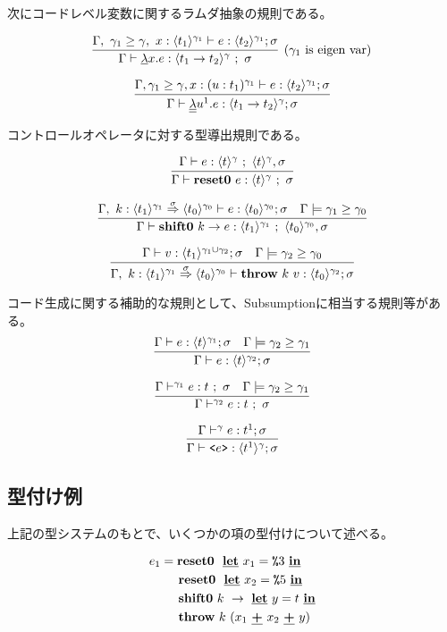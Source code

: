次にコードレベル変数に関するラムダ抽象の規則である。

\[
  \infer[(\gamma_1~\text{is eigen var})]
  {\Gamma \vdash \cfun{x}{e} : \codeT{t_1\to t_2}{\gamma} ~;~ \sigma}
  {\Gamma,~\gamma_1 \ord \gamma,~x:\codeT{t_1}{\gamma_1} \vdash e
    : \codeT{t_2}{\gamma_1}; \sigma}
\]

\[
  \infer
  {\Gamma \vdash \ccfun{u^1}{e} : \codeT{t_1 \to t_2}{\gamma} ; \sigma}
  {\Gamma, \gamma_1 \ord \gamma, x : (u : t_1)^{\gamma_1} \vdash e : \codeT{t_2}{\gamma_1} ; \sigma}
\]

コントロールオペレータに対する型導出規則である。

\[
  \infer{\Gamma \vdash \resetz{e} : \codeT{t}{\gamma} ~;~ \sigma}
  {\Gamma \vdash e : \codeT{t}{\gamma} ~;~ \codeT{t}{\gamma}, \sigma}
\]

\[
  \infer{\Gamma \vdash \shiftz{k}{e} : \codeT{t_1}{\gamma_1} ~;~ \codeT{t_0}{\gamma_0},\sigma}
  {\Gamma,~k:\contT{\codeT{t_1}{\gamma_1}}{\codeT{t_0}{\gamma_0}}{\sigma}
    \vdash e : \codeT{t_0}{\gamma_0} ; \sigma
    & \Gamma \models \gamma_1 \ord \gamma_0
  }
\]

\[
  \infer
  {\Gamma,~k:\contT{\codeT{t_1}{\gamma_1}}{\codeT{t_0}{\gamma_0}}{\sigma}
    \vdash \throw{k}{v} : \codeT{t_0}{\gamma_2} ; \sigma}
  {\Gamma
    \vdash v : \codeT{t_1}{\gamma_1 \cup \gamma_2} ; \sigma
    & \Gamma \models \gamma_2 \ord \gamma_0
  }
\]

コード生成に関する補助的な規則として、Subsumptionに相当する規則等がある。
\[
  \infer
  {\Gamma \vdash e : \codeT{t}{\gamma_2} ; \sigma}
  {\Gamma \vdash e : \codeT{t}{\gamma_1} ; \sigma
    & \Gamma \models \gamma_2 \ord \gamma_1
  }
\]

\[
  \infer
  {\Gamma \vdash^{\gamma_2} e : t ~;~ \sigma}
  {\Gamma \vdash^{\gamma_1} e : t ~;~ \sigma
    & \Gamma \models \gamma_2 \ord \gamma_1
  }
\]


\[
  \infer
  {\Gamma \vdash \code{e} : \codeT{t^1}{\gamma} ; \sigma}
  {\Gamma \vdash^{\gamma} e : t^1 ; \sigma}
\]


\subsection{型付け例}

上記の型システムのもとで、いくつかの項の型付けについて述べる。

\begin{align*}
  e_1 & = \textbf{reset0} ~~\underline{\textbf{let}}~x_1=\texttt{\%}{3}~\underline{\textbf{in}} \\
      & \phantom{=}~~ \textbf{reset0} ~~\underline{\textbf{let}}~x_2=\texttt{\%}{5}~\underline{\textbf{in}} \\
      & \phantom{=}~~ \textbf{shift0}~k~\to~\underline{\textbf{let}}~y=t~\underline{\textbf{in}} \\
      & \phantom{=}~~ \textbf{throw}~k~(x_1~\underline{\textbf{+}}~x_2~\underline{\textbf{+}}~y)
\end{align*}

